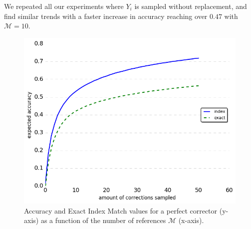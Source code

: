 \documentclass[letterpaper, 11pt]{article}
\begin{document}
We repeated all our experiments where $Y_i$ is sampled without replacement,
and find similar trends with a faster increase in accuracy reaching over $0.47$ with $\mathcal{M}=10$.

%
%
%
%

\begin{figure}
	\vspace{-1em}
  \includegraphics[width=0.9\columnwidth]{noSig_repeat_1000_accuracy}
  \caption{Accuracy and Exact Index Match values for a perfect corrector (y-axis)
    as a function of the number of references $\mathcal{M}$ (x-axis).
  } \label{fig:accuracy_vals}
  \vspace{-0.5cm}
\end{figure}
\end{document}
